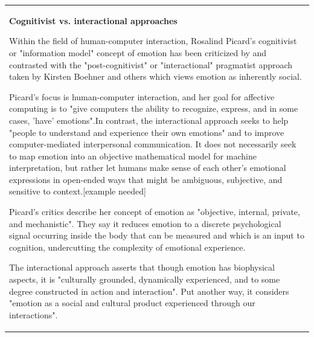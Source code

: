 \begin{center}
\begin{tabular}{|p{13cm}}
\textbf{Cognitivist vs. interactional approaches}

Within the field of human-computer interaction, Rosalind Picard's cognitivist or "information model" concept of emotion has been criticized by and contrasted with the "post-cognitivist" or "interactional" pragmatist approach taken by Kirsten Boehner and others which views emotion as inherently social.

Picard's focus is human-computer interaction, and her goal for affective computing is to "give computers the ability to recognize, express, and in some cases, 'have' emotions".In contrast, the interactional approach seeks to help "people to understand and experience their own emotions" and to improve computer-mediated interpersonal communication. It does not necessarily seek to map emotion into an objective mathematical model for machine interpretation, but rather let humans make sense of each other's emotional expressions in open-ended ways that might be ambiguous, subjective, and sensitive to context.[example needed]

Picard's critics describe her concept of emotion as "objective, internal, private, and mechanistic". They say it reduces emotion to a discrete psychological signal occurring inside the body that can be measured and which is an input to cognition, undercutting the complexity of emotional experience.

The interactional approach asserts that though emotion has biophysical aspects, it is "culturally grounded, dynamically experienced, and to some degree constructed in action and interaction". Put another way, it considers "emotion as a social and cultural product experienced through our interactions".


\end{tabular}
\end{center}

